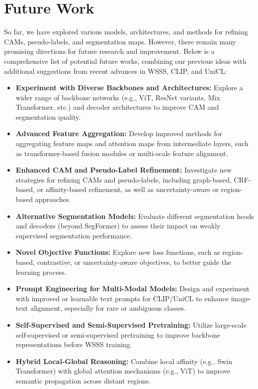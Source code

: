 \section{Future Work}
\label{sec:future}


So far, we have explored various models, architectures, and methods for refining CAMs, pseudo-labels, and segmentation maps. However, there remain many promising directions for future research and improvement. Below is a comprehensive list of potential future works, combining our previous ideas with additional suggestions from recent advances in WSSS, CLIP, and UniCL:

\begin{itemize}
    \item \textbf{Experiment with Diverse Backbones and Architectures:} Explore a wider range of backbone networks (e.g., ViT, ResNet variants, Mix Transformer, etc.) and decoder architectures to improve CAM and segmentation quality.
    \item \textbf{Advanced Feature Aggregation:} Develop improved methods for aggregating feature maps and attention maps from intermediate layers, such as transformer-based fusion modules or multi-scale feature alignment.
    \item \textbf{Enhanced CAM and Pseudo-Label Refinement:} Investigate new strategies for refining CAMs and pseudo-labels, including graph-based, CRF-based, or affinity-based refinement, as well as uncertainty-aware or region-based approaches.
    \item \textbf{Alternative Segmentation Models:} Evaluate different segmentation heads and decoders (beyond SegFormer) to assess their impact on weakly supervised segmentation performance.
    \item \textbf{Novel Objective Functions:} Explore new loss functions, such as region-based, contrastive, or uncertainty-aware objectives, to better guide the learning process.
    \item \textbf{Prompt Engineering for Multi-Modal Models:} Design and experiment with improved or learnable text prompts for CLIP/UniCL to enhance image-text alignment, especially for rare or ambiguous classes.
    \item \textbf{Self-Supervised and Semi-Supervised Pretraining:} Utilize large-scale self-supervised or semi-supervised pretraining to improve backbone representations before WSSS training.
    \item \textbf{Hybrid Local-Global Reasoning:} Combine local affinity (e.g., Swin Transformer) with global attention mechanisms (e.g., ViT) to improve semantic propagation across distant regions.

\end{itemize}
